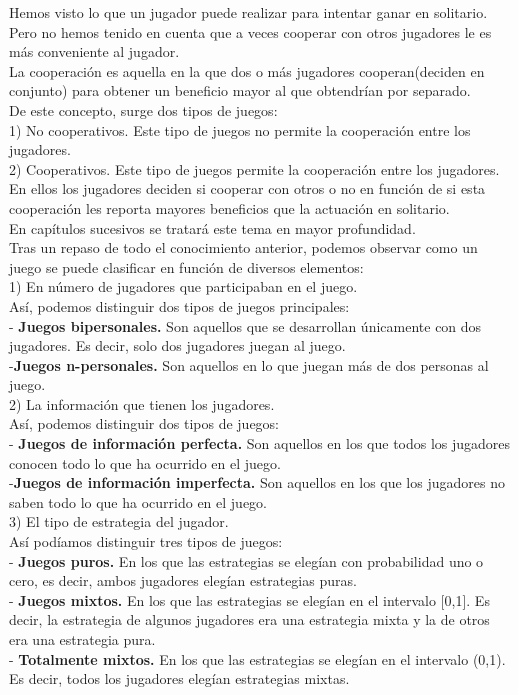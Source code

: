 \documentclass[10pt,a4paper]{book}
\begin{document}
Hemos visto lo que un jugador puede realizar para intentar ganar en solitario. Pero no hemos tenido en cuenta que a veces cooperar con otros jugadores le es más conveniente al jugador. \\
La cooperación es aquella en la que dos o más jugadores cooperan(deciden en conjunto) para obtener un beneficio mayor al que obtendrían por separado.\\
De este concepto, surge dos tipos de juegos:\\
1) No cooperativos. Este tipo de juegos no permite la cooperación entre los jugadores. \\
2) Cooperativos. Este tipo de juegos permite la cooperación entre los jugadores.\\
En ellos los jugadores deciden si cooperar con otros o no en función de si esta cooperación les reporta mayores beneficios que la actuación en solitario.\\
En capítulos sucesivos se tratará este tema en mayor profundidad.\\

Tras un repaso de todo el conocimiento anterior, podemos observar como un juego se puede clasificar en función de diversos elementos:\\

1) En número de jugadores que participaban en el juego.\\
Así, podemos distinguir dos tipos de juegos principales:\\
	- \textbf{Juegos bipersonales.} Son aquellos que se desarrollan únicamente con dos jugadores. Es decir, solo dos jugadores juegan al juego.\\
	-\textbf{Juegos n-personales.} Son aquellos en lo que juegan más de dos personas al juego.\\

2) La información que tienen los jugadores.\\
Así, podemos distinguir dos tipos de juegos:\\
	-\textbf{ Juegos de información perfecta.} Son aquellos en los que todos los jugadores conocen todo lo que ha ocurrido en el juego.\\
	-\textbf{Juegos de información imperfecta.} Son aquellos en los que los jugadores no saben todo lo que ha ocurrido en el juego.\\

3) El tipo de estrategia del jugador.\\
Así podíamos distinguir tres tipos de juegos:\\
	- \textbf{Juegos puros.} En los que las estrategias se elegían con probabilidad uno o cero, es decir, ambos jugadores elegían estrategias puras.\\
	- \textbf{Juegos mixtos.} En los que las estrategias se elegían en el intervalo [0,1]. Es decir, la estrategia de algunos jugadores era una estrategia mixta y la de otros era una estrategia pura.\\
	- \textbf{Totalmente mixtos.} En los que las estrategias se elegían en el intervalo (0,1). Es decir, todos los jugadores elegían estrategias mixtas.\\
\end{document}
